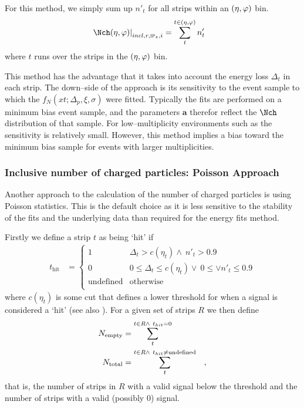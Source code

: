For this method, we simply sum up $n'_t$ for all strips within an
$(\eta,\varphi)$ bin.
\begin{align}
  \label{eq:density1}
  \dndetadphi[incl,r,\subIPz,i] &= \sum_t^{t\in\etaphi} n'_t
\end{align}
where $t$ runs over the strips in the $(\eta,\varphi)$ bin. 

This method has the advantage that it takes into account the energy
loss $\Delta_t$ in each strip.  The down--side of the approach is its
sensitivity to the event sample to which the
$f_N(xt;\Delta_p,\xi,\sigma)$ were fitted.  Typically the fits are
performed on a minimum bias event sample, and the parameters
$\mathbf{a}$ therefor reflect the $\Nch$ distribution of that sample.
For low--multiplicity environments such as \ppCol{} the sensitivity is
relatively small.  However, this method implies a bias toward the
minimum bias sample for events with larger multiplicities.

\subsubsection{Inclusive number of charged particles: Poisson Approach} 
\label{sec:sub:sub:poisson}

\newcommand\muR{\ensuremath\mu} Another approach to the calculation of
the number of charged particles is using Poisson statistics. This is
the default choice as it is less sensitive to the stability of the
fits and the underlying data than required for the energy fits method.

Firstly we define a strip $t$ as being `hit' if 
\begin{align*}
  t_{\text{hit}} &= \left\{ 
    \begin{array}{cl}
      1 & \Delta_t > c(\eta_t) \wedge\ n'_t > 0.9\\
      0 & 0 \leq \Delta_t \leq c(\eta_t)\vee\  0 \leq \vee n'_t \leq 0.9\\
      \text{undefined} & \text{otherwise}\\ 
    \end{array}\right.
\end{align*}
where $c(\eta_t)$ is some cut that defines a lower threshold for when
a signal is considered a `hit' (see also ).  For a
given set of strips $R$ we then define 
\begin{align*}
  \Nempty{} &= \sum_t^{t\in R\wedge\ t_{hit}=0}\\
  \Ntotal{} &= \sum_t^{t\in R\wedge\ t_{hit}\neq\text{undefined}}\quad,\\
\end{align*}
that is, the number of strips in $R$ with a valid signal below the
threshold and the number of strips with a valid (possibly 0) signal. 

